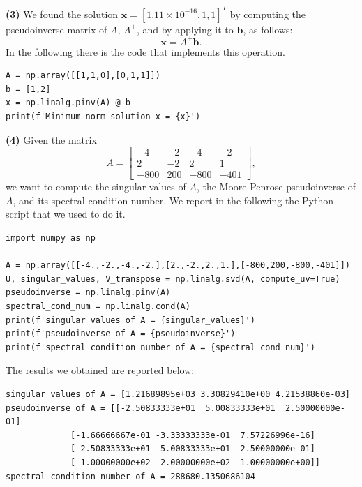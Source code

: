 \documentclass[a4paper,11pt]{article}
\begin{document}
\noindent \textbf{(3)} We found the solution $\textbf{x} = [1.11 \times 10^{-16},1,1]^T$ by computing the pseudoinverse matrix of $ A $, $ A^+ $, and by applying it to $ \textbf{b} $, as follows:
\begin{equation}\label{key}
	\textbf{x} = A^+ \textbf{b}.
\end{equation}
In the following there is the code that implements this operation.
\begin{verbatim}
A = np.array([[1,1,0],[0,1,1]])
b = [1,2]
x = np.linalg.pinv(A) @ b
print(f'Minimum norm solution x = {x}')
\end{verbatim}

\noindent \textbf{(4)} Given the matrix
\begin{equation}
	A = \begin{bmatrix}
		-4 & -2 & -4 & -2 \\
		2 & -2 & 2 & 1 \\
		-800 & 200 & -800 & -401
	\end{bmatrix},
\end{equation}
we want to compute the singular values of $A$, the Moore-Penrose pseudoinverse of $A$, and its spectral condition number. We report in the following the Python script that we used to do it.

\begin{verbatim}
import numpy as np

A = np.array([[-4.,-2.,-4.,-2.],[2.,-2.,2.,1.],[-800,200,-800,-401]])
U, singular_values, V_transpose = np.linalg.svd(A, compute_uv=True)
pseudoinverse = np.linalg.pinv(A)
spectral_cond_num = np.linalg.cond(A)
print(f'singular values of A = {singular_values}')
print(f'pseudoinverse of A = {pseudoinverse}')
print(f'spectral condition number of A = {spectral_cond_num}')
\end{verbatim}

\noindent The results we obtained are reported below:

\begin{verbatim}
singular values of A = [1.21689895e+03 3.30829410e+00 4.21538860e-03]
pseudoinverse of A = [[-2.50833333e+01  5.00833333e+01  2.50000000e-01]
		     [-1.66666667e-01 -3.33333333e-01  7.57226996e-16]
		     [-2.50833333e+01  5.00833333e+01  2.50000000e-01]
		     [ 1.00000000e+02 -2.00000000e+02 -1.00000000e+00]]
spectral condition number of A = 288680.1350686104
\end{verbatim}
\end{document}
